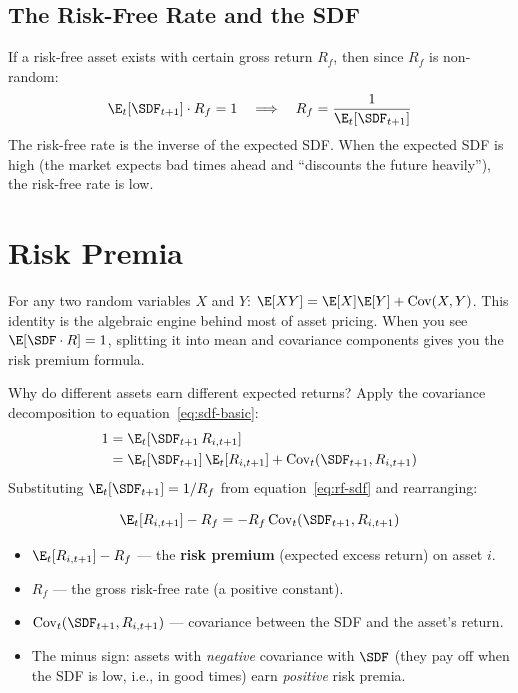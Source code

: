 \subsection{The Risk-Free Rate and the SDF}

If a risk-free asset exists with certain gross return $R_f$, then since $R_f$ is non-random:
\begin{equation}
\E_t[\SDF_{t+1}] \cdot R_f = 1 \quad \Longrightarrow \quad R_f = \frac{1}{\E_t[\SDF_{t+1}]}
\label{eq:rf-sdf}
\end{equation}
The risk-free rate is the inverse of the expected SDF. When the expected SDF is high (the market expects bad times ahead and ``discounts the future heavily''), the risk-free rate is low.

\section{Risk Premia}
\label{sec:risk-premia}

\begin{prereq}
For any two random variables $X$ and $Y$: $\E[XY] = \E[X]\E[Y] + \text{Cov}(X,Y)$. This identity is the algebraic engine behind most of asset pricing. When you see $\E[\SDF \cdot R] = 1$, splitting it into mean and covariance components gives you the risk premium formula.
\end{prereq}

Why do different assets earn different expected returns? Apply the covariance decomposition to equation~\eqref{eq:sdf-basic}:
\begin{align}
1 &= \E_t[\SDF_{t+1} \, R_{i,t+1}] \notag \\
  &= \E_t[\SDF_{t+1}] \, \E_t[R_{i,t+1}] + \text{Cov}_t(\SDF_{t+1}, R_{i,t+1})
\label{eq:cov-decomp}
\end{align}
Substituting $\E_t[\SDF_{t+1}] = 1/R_f$ from equation~\eqref{eq:rf-sdf} and rearranging:

\begin{definition}
\begin{equation}
\E_t[R_{i,t+1}] - R_f = -R_f \, \text{Cov}_t(\SDF_{t+1}, R_{i,t+1})
\label{eq:risk-premium}
\end{equation}
\begin{itemize}[nosep]
  \item $\E_t[R_{i,t+1}] - R_f$ --- the \textbf{risk premium} (expected excess return) on asset $i$.
  \item $R_f$ --- the gross risk-free rate (a positive constant).
  \item $\text{Cov}_t(\SDF_{t+1}, R_{i,t+1})$ --- covariance between the SDF and the asset's return.
  \item The minus sign: assets with \emph{negative} covariance with $\SDF$ (they pay off when the SDF is low, i.e., in good times) earn \emph{positive} risk premia.
\end{itemize}
\end{definition}

